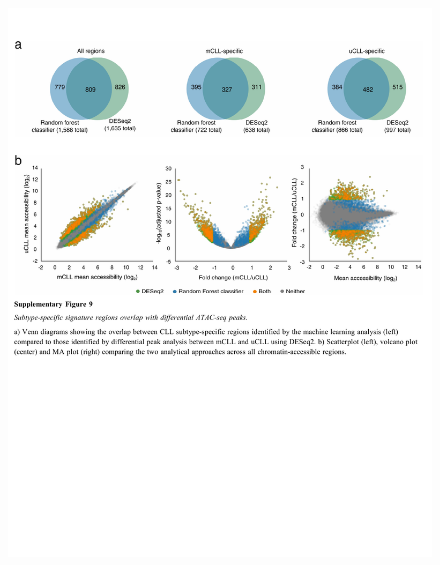 \documentclass[10pt,]{article}
\begin{document}
\begin{figure}
\centering
\includegraphics[width=1.000\hsize]{figures/Supplementary_Information_09.pdf}
\end{figure}
\clearpage
\end{document}

